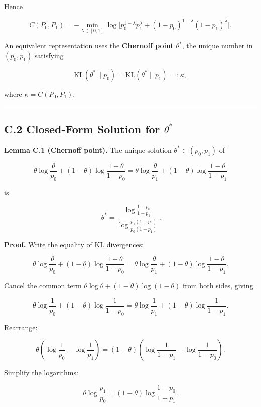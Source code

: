 \documentclass[
  12pt,
]{article}
\begin{document}
Hence

\[
C(P_0,P_1) = -\min_{\lambda\in[0,1]} \log\bigl[p_0^{1-\lambda}p_1^\lambda + (1-p_0)^{1-\lambda}(1-p_1)^\lambda\bigr]. \tag{C.1}
\]

An equivalent representation uses the \textbf{Chernoff point}
\(\theta^*\), the unique number in \((p_0,p_1)\) satisfying

\[
\text{KL}(\theta^*\|p_0) = \text{KL}(\theta^*\|p_1) =: \kappa,
\]

where \(\kappa = C(P_0,P_1)\).

\begin{center}\rule{0.5\linewidth}{0.5pt}\end{center}

\subsection{\texorpdfstring{C.2 Closed-Form Solution for
\(\theta^*\)}{C.2 Closed-Form Solution for \textbackslash theta\^{}*}}\label{c.2-closed-form-solution-for-theta}

\textbf{Lemma C.1 (Chernoff point).} The unique solution
\(\theta^* \in (p_0,p_1)\) of

\[
\theta\log\frac{\theta}{p_0} + (1-\theta)\log\frac{1-\theta}{1-p_0}
= \theta\log\frac{\theta}{p_1} + (1-\theta)\log\frac{1-\theta}{1-p_1}
\]

is

\[
\boxed{\;
\theta^* = \frac{\displaystyle\log\frac{1-p_0}{1-p_1}}
                 {\displaystyle\log\frac{p_1(1-p_0)}{p_0(1-p_1)}}\;}. \tag{C.2}
\]

\textbf{Proof.} Write the equality of KL divergences:

\[
\theta\log\frac{\theta}{p_0} + (1-\theta)\log\frac{1-\theta}{1-p_0}
= \theta\log\frac{\theta}{p_1} + (1-\theta)\log\frac{1-\theta}{1-p_1}.
\]

Cancel the common term \(\theta\log\theta + (1-\theta)\log(1-\theta)\)
from both sides, giving

\[
\theta\log\frac{1}{p_0} + (1-\theta)\log\frac{1}{1-p_0}
= \theta\log\frac{1}{p_1} + (1-\theta)\log\frac{1}{1-p_1}.
\]

Rearrange:

\[
\theta\left(\log\frac{1}{p_0} - \log\frac{1}{p_1}\right)
= (1-\theta)\left(\log\frac{1}{1-p_1} - \log\frac{1}{1-p_0}\right).
\]

Simplify the logarithms:

\[
\theta\log\frac{p_1}{p_0} = (1-\theta)\log\frac{1-p_0}{1-p_1}.
\]
\end{document}
